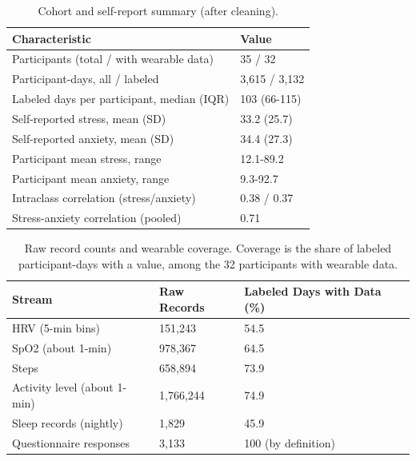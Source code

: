 \documentclass[11pt, a4paper, oneside]{article}
\begin{document}
\begin{table}[H]
    \centering
    \caption{Cohort and self-report summary (after cleaning).}
    \begin{tabularx}{\textwidth}{XX}
        \toprule
        \textbf{Characteristic} & \textbf{Value}\\
        \midrule
        Participants (total / with wearable data) & 35 / 32\\
        Participant-days, all / labeled & 3,615 / 3,132\\
        Labeled days per participant, median (IQR) & 103 (66-115)\\
        Self-reported stress, mean (SD) & 33.2 (25.7)\\
        Self-reported anxiety, mean (SD) & 34.4 (27.3)\\
        Participant mean stress, range & 12.1-89.2\\
        Participant mean anxiety, range & 9.3-92.7\\
        Intraclass correlation (stress/anxiety) & 0.38 / 0.37\\
        Stress-anxiety correlation (pooled) & 0.71\\
        \bottomrule
    \end{tabularx}
    \label{tab:Table_1}
\end{table}

\begin{table}[H]
    \centering
    \caption{Raw record counts and wearable coverage. Coverage is the share of labeled participant-days with a value, among the 32 participants with wearable data.}
    \begin{tabularx}{\textwidth}{XXX}
        \toprule
        \textbf{Stream} & \textbf{Raw Records} & \textbf{Labeled Days with Data (\%)}\\
        \midrule
        HRV (5-min bins) & 151,243 & 54.5\\
        SpO2 (about 1-min) & 978,367 & 64.5\\
        Steps & 658,894 & 73.9\\
        Activity level (about 1-min) & 1,766,244 & 74.9\\
        Sleep records (nightly) & 1,829 & 45.9\\
        Questionnaire responses & 3,133 & 100 (by definition)\\
        \bottomrule
    \end{tabularx}
    \label{tab:Table_2}
\end{table}
\end{document}
